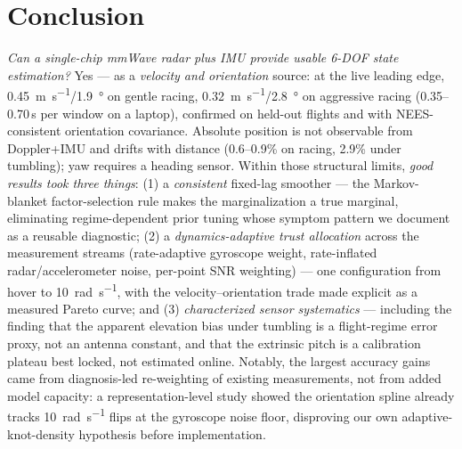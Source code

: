 \documentclass[journal]{IEEEtran}
\begin{document}
\section{Conclusion}
\label{sec:conclusion}

\emph{Can a single-chip mmWave radar plus IMU provide usable 6-DOF
state estimation?}  Yes --- as a \emph{velocity and orientation}
source: at the live leading edge,
\SI{0.45}{\metre\per\second}/\SI{1.9}{\degree} on gentle racing,
\SI{0.32}{\metre\per\second}/\SI{2.8}{\degree} on aggressive racing
(0.35--0.70\,s per window on a laptop), confirmed on held-out flights
and with NEES-consistent orientation covariance.
Absolute position is not observable from Doppler+IMU and drifts with
distance (0.6--0.9\% on racing, 2.9\% under tumbling); yaw requires a
heading sensor.  Within those structural limits, \emph{good results
took three things}: (1) a \emph{consistent} fixed-lag smoother ---
the Markov-blanket factor-selection rule makes the marginalization a
true marginal, eliminating regime-dependent prior tuning whose
symptom pattern we document as a reusable diagnostic;
(2) a \emph{dynamics-adaptive trust allocation} across the
measurement streams (rate-adaptive gyroscope weight, rate-inflated
radar/accelerometer noise, per-point SNR weighting) --- one
configuration from hover to \SI{10}{\radian\per\second}, with the
velocity--orientation trade made explicit as a measured Pareto curve;
and (3) \emph{characterized sensor systematics} --- including the
finding that the apparent elevation bias under tumbling is a
flight-regime error proxy, not an antenna constant, and that the
extrinsic pitch is a calibration plateau best locked, not estimated
online.  Notably, the largest accuracy gains came from diagnosis-led
re-weighting of existing measurements, not from added model capacity:
a representation-level study showed the orientation spline already
tracks \SI{10}{\radian\per\second} flips at the gyroscope noise floor,
disproving our own adaptive-knot-density hypothesis before
implementation.
\end{document}
